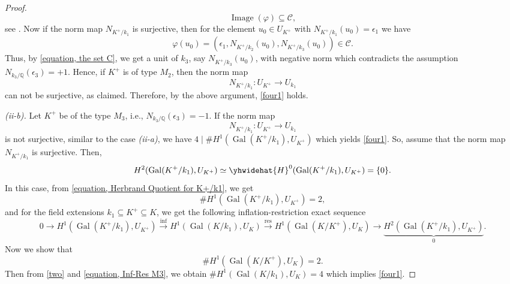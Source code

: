 \documentclass[12pt]{amsart}
\theoremstyle{definition}
\numberwithin{equation}{section}
\DeclareMathOperator{\Gal}{Gal}
\DeclareMathOperator{\Image}{Image}
\begin{document}
\begin{proof}
\begin{equation}
			\Image(\varphi) \subseteq \mathcal{C},
		\end{equation}
		 see \cite[p. 161]{Bennett}.
		 Now if the norm map $N_{K^+/k_1}$ is surjective, then for the element $u_0 \in U_{K^+}$ with $N_{K^+/k_1}(u_0)=\epsilon_1$ we have
		\begin{equation*}
			\varphi(u_0)=\left( \epsilon_1, N_{K^+/k_2}(u_0),N_{K^+/k_3}(u_0)\right) \in \mathcal{C}.
		\end{equation*}
		Thus, by \eqref{equation, the set C}, we get a unit of $k_3$, say $N_{K^+/k_3}(u_0)$, with negative norm which contradicts the assumption $N_{k_3/\mathbb{Q}}(\epsilon_3)=+1$. Hence, if $K^+$ is of type $M_2$, then the norm map 
		\begin{equation*}
			N_{K^+/k_1}:U_{K^+} \rightarrow U_{k_1}
		\end{equation*} 
can not be surjective, as claimed. Therefore, by the above argument, \eqref{four1} holds.
		
\smallskip		
\textit{(ii-b).} 
		Let $K^+$ be of the type $M_3$, i.e., $N_{k_3/\mathbb{Q}}(\epsilon_3)=-1$. If	the norm map
		\begin{equation*}
			N_{K^+/k_1}:U_{K^+} \rightarrow U_{k_1}
		\end{equation*}
	is not surjective, similar to the case \textit{(ii-a)}, we have 
$4 \mid \# H^1(\Gal(K^+/k_1),U_{K^+})$ which yields \eqref{four1}.
So, assume that the norm map $N_{K^+/k_1}$ is surjective. Then, 
\begin{equation*}
	H^2(\Gal(K^+/k_1),U_{K^+}) \simeq 	\yhwidehat{H}^0(\Gal(K^+/k_1),U_{K^+})=\{0\}.
\end{equation*} 
In this case, from \eqref{equation, Herbrand Quotient for K+/k1}, we get
 \begin{equation}
 \label{two}
 	\# H^1(\Gal(K^+/k_1),U_{K^+})=2,
 \end{equation}
and for the field extensions $k_1 \subseteq K^+ \subseteq K$, we get the following inflation-restriction exact sequence
{\small 
\begin{equation} \label{equation, Inf-Res M3}
0 \rightarrow H^1(\Gal(K^+/k_1),U_{ K^+}) \xrightarrow{\text{inf}} H^1(\Gal(K/k_1),U_K) \xrightarrow{\text{res}} H^1(\Gal(K/K^+),U_K) \rightarrow \underbrace{H^2(\Gal(K^+/k_1),U_{K^+})}_{0}.
\end{equation}} 
Now we show that 
\begin{equation} \label{equation, H1 K/K+=2}
\# H^1(\Gal(K/K^+),U_K) =2.
\end{equation}
Then from \eqref{two} and \eqref{equation, Inf-Res M3}, we obtain
$ \# H^1(\Gal(K/k_1),U_{K})=4$ which implies \eqref{four1}.


\end{proof}
\end{document}
